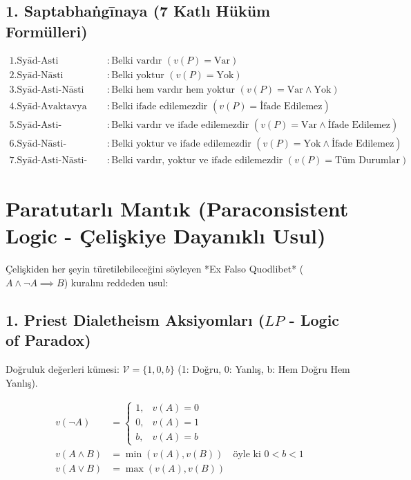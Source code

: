 \documentclass[11pt, a4paper]{article}
\begin{document}
\subsection{1. Saptabhaṅgīnaya (7 Katlı Hüküm Formülleri)}
\begin{align}
1. \text{Syād-Asti} &: \text{Belki vardır } (v(P) = \text{Var}) \\
2. \text{Syād-Nāsti} &: \text{Belki yoktur } (v(P) = \text{Yok}) \\
3. \text{Syād-Asti-Nāsti} &: \text{Belki hem vardır hem yoktur } (v(P) = \text{Var} \land \text{Yok}) \\
4. \text{Syād-Avaktavya} &: \text{Belki ifade edilemezdir } (v(P) = \text{İfade Edilemez}) \\
5. \text{Syād-Asti-Avaktavya} &: \text{Belki vardır ve ifade edilemezdir } (v(P) = \text{Var} \land \text{İfade Edilemez}) \\
6. \text{Syād-Nāsti-Avaktavya} &: \text{Belki yoktur ve ifade edilemezdir } (v(P) = \text{Yok} \land \text{İfade Edilemez}) \\
7. \text{Syād-Asti-Nāsti-Avaktavya} &: \text{Belki vardır, yoktur ve ifade edilemezdir } (v(P) = \text{Tüm Durumlar})
\end{align}

\section{Paratutarlı Mantık (Paraconsistent Logic - Çelişkiye Dayanıklı Usul)}

Çelişkiden her şeyin türetilebileceğini söyleyen *Ex Falso Quodlibet* ($A \land \neg A \implies B$) kuralını reddeden usul:

\subsection{1. Priest Dialetheism Aksiyomları ($LP$ - Logic of Paradox)}
Doğruluk değerleri kümesi: $\mathcal{V} = \{1, 0, b\}$ (1: Doğru, 0: Yanlış, b: Hem Doğru Hem Yanlış).

\begin{align}
v(\neg A) &= 
\begin{cases}
1, & v(A) = 0 \\
0, & v(A) = 1 \\
b, & v(A) = b
\end{cases} \\
v(A \land B) &= \min(v(A), v(B)) \quad \text{öyle ki } 0 < b < 1 \\
v(A \lor B) &= \max(v(A), v(B))
\end{align}
\end{document}
